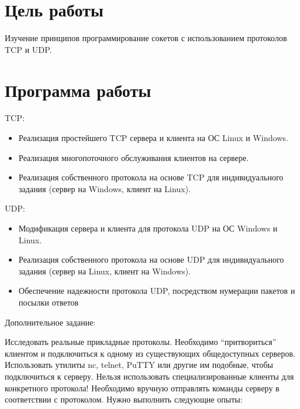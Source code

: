 




%


\makeatletter
\def\lst@PlaceNumber{\llap{\normalfont
                \lst@numberstyle{\the\lst@lineno}\kern\lst@numbersep}}
\makeatother


\section{Цель работы}

Изучение принципов программирование сокетов с использованием протоколов TCP и UDP.

\section{Программа работы}

TCP:

\begin{itemize}
\item Реализация простейшего TCP сервера и клиента на ОС Linux и Windows.
\item Реализация многопоточного обслуживания клиентов на сервере.
\item Реализация собственного протокола на основе TCP для индивидуального задания (сервер на Windows, клиент на Linux).
\end{itemize}

UDP:

\begin{itemize}
\item Модификация сервера и клиента для протокола UDP на ОС Windows и Linux.
\item Реализация собственного протокола на основе UDP для индивидуального задания (сервер на Linux, клиент на Windows).
\item Обеспечение надежности протокола UDP, посредством нумерации пакетов и посылки ответов
\end{itemize}

Дополнительное задание:

Исследовать реальные прикладные протоколы. Необходимо “притвориться” клиентом и подключиться к одному из существующих общедоступных серверов. Использовать утилиты nc, telnet, PuTTY или другие им подобные, чтобы подключиться к серверу. Нельзя использовать специализированные клиенты для конкретного протокола! Необходимо вручную отправлять команды серверу в соответствии с протоколом. Нужно выполнить следующие опыты:

